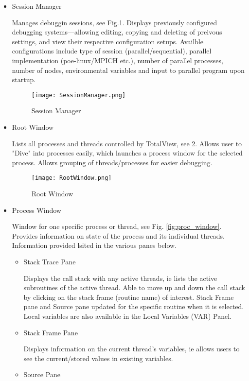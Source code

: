 \documentclass{article}
\begin{document}
\begin{itemize}
	\item Session Manager
	
	Manages debuggin sessions, see Fig.\ref{fig:sess_manager}. Displays previously configured debugging systems---allowing editing, copying and deleting of preivous settings, and view their respective configuration setups. Availble configurations include type of session (parallel/sequential), parallel implementation (poe-linux/MPICH etc.), number of parallel processes, number of nodes, environmental variables and input to parallel program upon startup.
	\begin{figure}[p] %
			\texttt{[image: SessionManager.png]}
		\caption{Session Manager}
		\label{fig:sess_manager}
	\end{figure}
	\item Root Window
	
	Lists all processes and threads controlled by TotalView, see \ref{fig:root_window}. Allows user to "Dive" into processes easily, which launches a process window for the selected process. Allows grouping of threads/processes for easier debugging.
		\begin{figure}[p] %
			\texttt{[image: RootWindow.png]}
		\caption{Root Window}
		\label{fig:root_window}
	\end{figure}
	\item Process Window
	
	Window for one specific process or thread, see Fig. \ref{fig:proc_window}. Provides information on state of the process and its individual threads. Information provided lsited in the various panes below.
	\begin{itemize}
		\item Stack Trace Pane
		
		Displays the call stack with any active threads, ie lists the active subroutines of the active thread. Able to move up and down the call stack by clicking on the stack frame (routine name) of interest. Stack Frame pane and Source pane updated for the specific routine when it is selected. Local variables are also available in the Local Variables (VAR) Panel.
		\item Stack Frame Pane
		
		Displays information on the current thread's variables, ie allows users to see the current/stored values in existing variables.
		\item Source Pane
		

\end{itemize}
\end{itemize}
\end{document}
